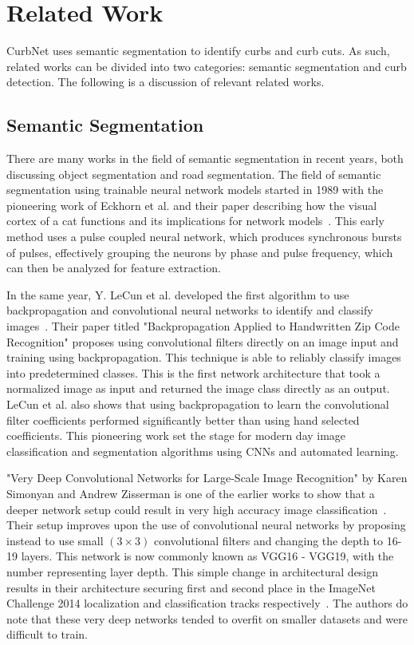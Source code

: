 \chapter{Related Work}\label{chap:relatedwork}
CurbNet uses semantic segmentation to identify curbs and curb cuts.
As such, related works can be divided into two categories: semantic segmentation and curb detection.
The following is a discussion of relevant related works.

\section{Semantic Segmentation}\label{section:relatedwork-segmentation}
There are many works in the field of semantic segmentation in recent years, both discussing object segmentation and road segmentation.
The field of semantic segmentation using trainable neural network models started in 1989 with the pioneering work of Eckhorn et al. and their paper describing how the visual cortex of a cat functions and its implications for network models~\cite{eckhorncat}.
This early method uses a pulse coupled neural network, which produces synchronous bursts of pulses, effectively grouping the neurons by phase and pulse frequency, which can then be analyzed for feature extraction.

In the same year, Y. LeCun et al. developed the first algorithm to use backpropagation and convolutional neural networks to identify and classify images~\cite{zipcode}.
Their paper titled "Backpropagation Applied to Handwritten Zip Code Recognition" proposes using convolutional filters directly on an image input and training using backpropagation.
This technique is able to reliably classify images into predetermined classes.
This is the first network architecture that took a normalized image as input and returned the image class directly as an output.
LeCun et al. also shows that using backpropagation to learn the convolutional filter coefficients performed significantly better than using hand selected coefficients.
This pioneering work set the stage for modern day image classification and segmentation algorithms using CNNs and automated learning.

"Very Deep Convolutional Networks for Large-Scale Image Recognition" by Karen Simonyan and Andrew Zisserman is one of the earlier works to show that a deeper network setup could result in very high accuracy image classification~\cite{vgg}.
Their setup improves upon the use of convolutional neural networks by proposing instead to use small $\left(3 \times 3\right)$ convolutional filters and changing the depth to 16-19 layers.
This network is now commonly known as VGG16 - VGG19, with the number representing layer depth.
This simple change in architectural design results in their architecture securing first and second place in the ImageNet Challenge 2014 localization and classification tracks respectively~\cite{vgg}.
The authors do note that these very deep networks tended to overfit on smaller datasets and were difficult to train.

